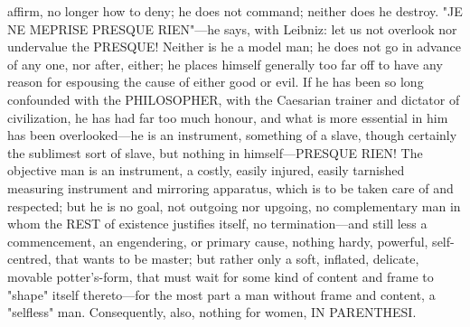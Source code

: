 \documentclass[12pt]{article}
\begin{document}
affirm, no longer how to deny; he does not command; neither does he destroy. "JE NE MEPRISE PRESQUE RIEN"---he says, with Leibniz: let us not overlook nor undervalue the PRESQUE! Neither is he a model man; he does not go in advance of any one, nor after, either; he places himself generally too far off to have any reason for espousing the cause of either good or evil. If he has been so long confounded with the PHILOSOPHER, with the Caesarian trainer and dictator of civilization, he has had far too much honour, and what is more essential in him has been overlooked---he is an instrument, something of a slave, though certainly the sublimest sort of slave, but nothing in himself---PRESQUE RIEN! The objective man is an instrument, a costly, easily injured, easily tarnished measuring instrument and mirroring apparatus, which is to be taken care of and respected; but he is no goal, not outgoing nor upgoing, no complementary man in whom the REST of existence justifies itself, no termination---and still less a commencement, an engendering, or primary cause, nothing hardy, powerful, self-centred, that wants to be master; but rather only a soft, inflated, delicate, movable potter's-form, that must wait for some kind of content and frame to "shape" itself thereto---for the most part a man without frame and content, a "selfless" man. Consequently, also, nothing for women, IN PARENTHESI.
\end{document}
